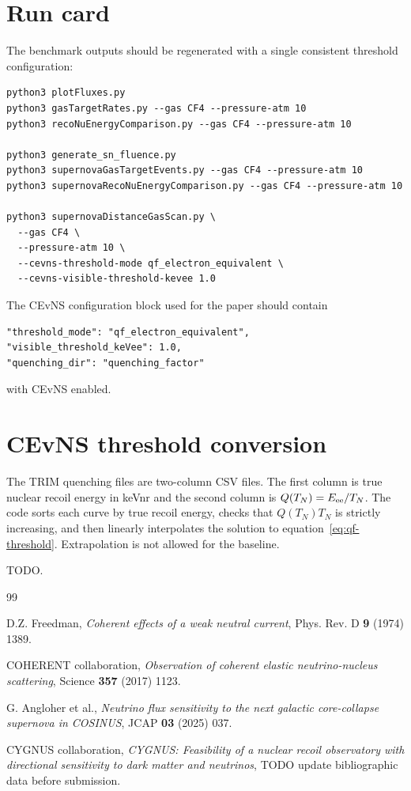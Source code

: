 \documentclass[a4paper,11pt]{article}
\begin{document}
\appendix

\section{Run card}
\label{app:run-card}

The benchmark outputs should be regenerated with a single consistent threshold
configuration:
\begin{verbatim}
python3 plotFluxes.py
python3 gasTargetRates.py --gas CF4 --pressure-atm 10
python3 recoNuEnergyComparison.py --gas CF4 --pressure-atm 10

python3 generate_sn_fluence.py
python3 supernovaGasTargetEvents.py --gas CF4 --pressure-atm 10
python3 supernovaRecoNuEnergyComparison.py --gas CF4 --pressure-atm 10

python3 supernovaDistanceGasScan.py \
  --gas CF4 \
  --pressure-atm 10 \
  --cevns-threshold-mode qf_electron_equivalent \
  --cevns-visible-threshold-kevee 1.0
\end{verbatim}

The CEvNS configuration block used for the paper should contain
\begin{verbatim}
"threshold_mode": "qf_electron_equivalent",
"visible_threshold_keVee": 1.0,
"quenching_dir": "quenching_factor"
\end{verbatim}
with CEvNS enabled.

\section{CEvNS threshold conversion}
\label{app:qf}

The TRIM quenching files are two-column CSV files. The first column is true
nuclear recoil energy in keVnr and the second column is
$Q(T_N)=E_{\rm ee}/T_N$. The code sorts each curve by true recoil energy,
checks that $Q(T_N)T_N$ is strictly increasing, and then linearly interpolates
the solution to equation~\eqref{eq:qf-threshold}. Extrapolation is not allowed
for the baseline.

\acknowledgments

TODO.

\begin{thebibliography}{99}

D.Z. Freedman,
\emph{Coherent effects of a weak neutral current},
Phys. Rev. D {\bf 9} (1974) 1389.

COHERENT collaboration,
\emph{Observation of coherent elastic neutrino-nucleus scattering},
Science {\bf 357} (2017) 1123.

\bibitem{Angloher2025}
G. Angloher et al.,
\emph{Neutrino flux sensitivity to the next galactic core-collapse supernova in COSINUS},
JCAP {\bf 03} (2025) 037.

\bibitem{CYGNUS}
CYGNUS collaboration,
\emph{CYGNUS: Feasibility of a nuclear recoil observatory with directional sensitivity to dark matter and neutrinos},
TODO update bibliographic data before submission.

\end{thebibliography}
\end{document}
